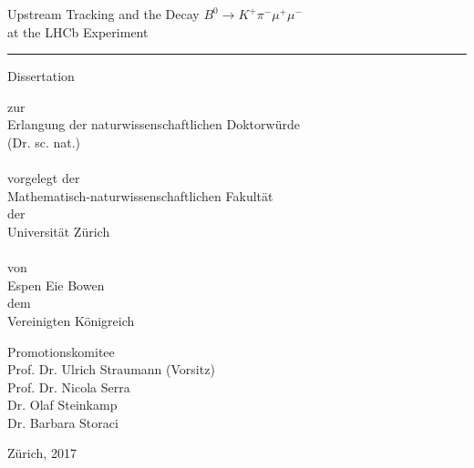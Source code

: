 \begin{titlepage}
 
\vspace*{-1.5cm}

\begin{center}
{\Large
Upstream Tracking and the Decay $B^{0} \to K^{+}\pi^{-}\mu^{+}\mu^{-}$\\ at the LHCb Experiment

\rule{\linewidth}{0.5pt}
}

\vspace*{1cm}

{\large
Dissertation \\
}

zur \\
Erlangung der naturwissenschaftlichen Doktorw\"urde \\ (Dr. sc. nat.) \\~\\
vorgelegt der \\ Mathematisch-naturwissenschaftlichen Fakult\"at \\
der \\
Universit\"at Z\"urich \\~\\
von \\
Espen Eie Bowen \\
dem \\
Vereinigten K\"onigreich \\

\vspace*{1cm}

Promotionskomitee \\
Prof. Dr. Ulrich Straumann (Vorsitz) \\
Prof. Dr. Nicola Serra \\
Dr. Olaf Steinkamp \\
Dr. Barbara Storaci \\

\vspace*{1cm}

Z\"urich, 2017

\end{center}
\end{titlepage}